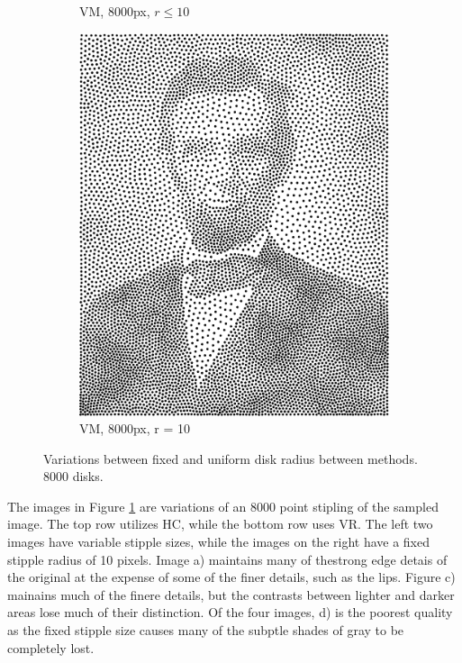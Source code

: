 \documentclass[11pt]{article}
\begin{document}
\begin{figure}[H]
\begin{subfigure}[b]{0.4\linewidth}
		\caption{VM, 8000px, $r \le 10$}
	\end{subfigure}
	\begin{subfigure}[b]{0.4\linewidth}
		\includegraphics[width=\linewidth]{pix/vr_AL_8000_fixed_10.png}
		\caption{VM, 8000px, r = 10}
	\end{subfigure}
	\caption{Variations between fixed and uniform disk radius between methods. 8000 disks.}
	\label{fig:vr_hc_fixed}
\end{figure}

The images in Figure \ref{fig:vr_hc_fixed} are variations of an 8000 point stipling of the sampled image. The top row utilizes HC, while the bottom row uses VR. The left two images have variable stipple sizes, while the images on the right have a fixed stipple radius of 10 pixels. Image a) maintains many of thestrong  edge detais of the original at the expense of some of the finer details, such as the lips. Figure c) mainains much of the finere details, but the contrasts between lighter and darker areas lose much of their distinction. Of the four images, d) is the poorest quality as the fixed stipple size causes many of the subptle shades of gray to be completely lost. 
\end{document}
